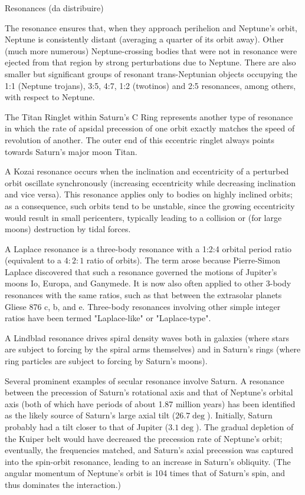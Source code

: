 \begin{frame}{Resonances (da distribuire)}


The resonance ensures that, when they approach perihelion and Neptune's orbit, Neptune is consistently distant (averaging a quarter of its orbit away). Other (much more numerous) Neptune-crossing bodies that were not in resonance were ejected from that region by strong perturbations due to Neptune. There are also smaller but significant groups of resonant trans-Neptunian objects occupying the 1:1 (Neptune trojans), 3:5, 4:7, 1:2 (twotinos) and 2:5 resonances, among others, with respect to Neptune.

The Titan Ringlet within Saturn's C Ring represents another type of resonance in which the rate of apsidal precession of one orbit exactly matches the speed of revolution of another. The outer end of this eccentric ringlet always points towards Saturn's major moon Titan.

A Kozai resonance occurs when the inclination and eccentricity of a perturbed orbit oscillate synchronously (increasing eccentricity while decreasing inclination and vice versa). This resonance applies only to bodies on highly inclined orbits; as a consequence, such orbits tend to be unstable, since the growing eccentricity would result in small pericenters, typically leading to a collision or (for large moons) destruction by tidal forces.

A Laplace resonance is a three-body resonance with a 1:2:4 orbital period ratio (equivalent to a $4:2:1$ ratio of orbits). The term arose because Pierre-Simon Laplace discovered that such a resonance governed the motions of Jupiter's moons Io, Europa, and Ganymede. It is now also often applied to other 3-body resonances with the same ratios, such as that between the extrasolar planets Gliese 876 c, b, and e. Three-body resonances involving other simple integer ratios have been termed "Laplace-like" or "Laplace-type".

A Lindblad resonance drives spiral density waves both in galaxies (where stars are subject to forcing by the spiral arms themselves) and in Saturn's rings (where ring particles are subject to forcing by Saturn's moons).

Several prominent examples of secular resonance involve Saturn. A resonance between the precession of Saturn's rotational axis and that of Neptune's orbital axis (both of which have periods of about 1.87 million years) has been identified as the likely source of Saturn's large axial tilt ($26.7\deg$). Initially, Saturn probably had a tilt closer to that of Jupiter ($3.1\deg$). The gradual depletion of the Kuiper belt would have decreased the precession rate of Neptune's orbit; eventually, the frequencies matched, and Saturn's axial precession was captured into the spin-orbit resonance, leading to an increase in Saturn's obliquity. (The angular momentum of Neptune's orbit is 104 times that of Saturn's spin, and thus dominates the interaction.)


\end{frame}
